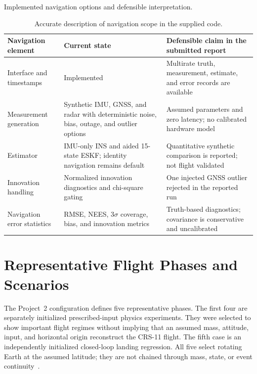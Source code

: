 \documentclass[11pt,letterpaper]{article}
\begin{document}
\begin{table}[H]
\centering
\caption{Implemented navigation options and defensible interpretation.}\label{tab:navigation}
\begin{tabularx}{\textwidth}{p{}YY}
\toprule
{}\color{white}\textbf{Navigation element} & \color{white}\textbf{Current state} & \color{white}\textbf{Defensible claim in the submitted report}\\
\midrule
Interface and timestamps & Implemented & Multirate truth, measurement, estimate, and error records are available\\
Measurement generation & Synthetic IMU, GNSS, and radar with deterministic noise, bias, outage, and outlier options & Assumed parameters and zero latency; no calibrated hardware model\\
Estimator & IMU-only INS and aided 15-state ESKF; identity navigation remains default & Quantitative synthetic comparison is reported; not flight validated\\
Innovation handling & Normalized innovation diagnostics and chi-square gating & One injected GNSS outlier rejected in the reported run\\
Navigation error statistics & RMSE, NEES, 3$\sigma$ coverage, bias, and innovation metrics & Truth-based diagnostics; covariance is conservative and uncalibrated\\
\bottomrule
\end{tabularx}
\caption{Accurate description of navigation scope in the supplied code.}\label{tab:navigation}
\end{table}

\section{Representative Flight Phases and Scenarios}\label{sec:scenarios}

The Project~2 configuration defines five representative phases. The first four are separately initialized prescribed-input physics experiments. They were selected to show important flight regimes without implying that an assumed mass, attitude, input, and horizontal origin reconstruct the CRS-11 flight. The fifth case is an independently initialized closed-loop landing regression. All five select rotating Earth at the assumed latitude; they are not chained through mass, state, or event continuity~\cite{scenario_spec}.
\end{document}
